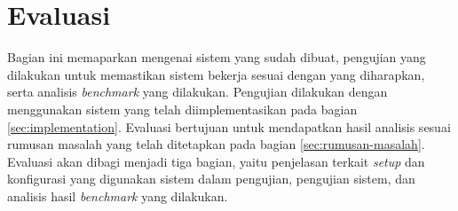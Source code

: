 \section{Evaluasi}
\label{sec:evaluasi}

Bagian ini memaparkan mengenai sistem yang sudah dibuat, pengujian yang dilakukan untuk memastikan sistem bekerja sesuai dengan yang diharapkan, serta analisis \textit{benchmark} yang dilakukan. Pengujian dilakukan dengan menggunakan sistem yang telah diimplementasikan pada bagian \ref{sec:implementation}. Evaluasi bertujuan untuk mendapatkan hasil analisis sesuai rumusan masalah yang telah ditetapkan pada bagian \ref{sec:rumusan-masalah}. Evaluasi akan dibagi menjadi tiga bagian, yaitu penjelasan terkait \textit{setup} dan konfigurasi yang digunakan sistem dalam pengujian, pengujian sistem, dan analisis hasil \textit{benchmark} yang dilakukan.



